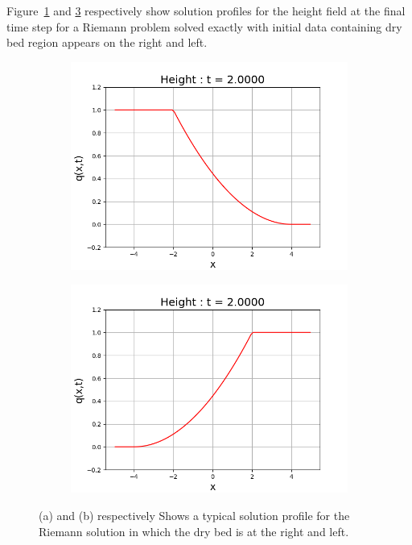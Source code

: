 \documentclass[12pt,a4paper]{article}
\begin{document}
	
	  Figure~\ref{fig:right} and \ref{fig:left} respectively show solution profiles for the height field at the final time step for a Riemann problem  solved exactly with initial data containing dry bed region appears on the right and left.
	  \begin{figure}[H]
	  	\begin{subfigure}[b]{0.5\textwidth}
	  		\centering
	  		\includegraphics[width=1.0\linewidth]{images/right}
	  		\caption{}
	  		\label{fig:right}
	  	\end{subfigure}
	  	\begin{subfigure}[b]{0.5\textwidth}
	  		\centering
	  		\includegraphics[width=1.0\linewidth]{images/left}
	  		\caption{}
	  		\label{fig:left}
	  	\end{subfigure}
	  	\caption{(a) and (b) respectively Shows a typical solution profile for the Riemann solution in which the dry bed is at the right and left. }
	  \end{figure}
\end{document}
